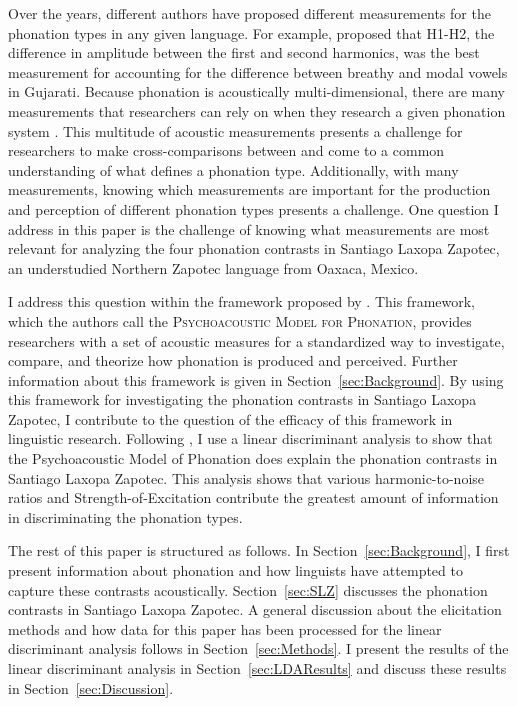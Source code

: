 \documentclass[12pt, letterpaper]{article}
\begin{document}
Over the years, different authors have proposed different measurements for the phonation types in any given language. For example, \citet{fischer-jorgensenPhoneticAnalysisBreathy1968} proposed that H1-H2, the difference in amplitude between the first and second harmonics, was the best measurement for accounting for the difference between breathy and modal vowels in Gujarati. Because phonation is acoustically multi-dimensional, there are many measurements that researchers can rely on when they research a given phonation system \citep{garellekAcousticDiscriminabilityComplex2020}. This multitude of acoustic measurements presents a challenge for researchers to make cross-comparisons between and come to a common understanding of what defines a phonation type. Additionally, with many measurements, knowing which measurements are important for the production and perception of different phonation types presents a challenge. One question I address in this paper is the challenge of knowing what measurements are most relevant for analyzing the four phonation contrasts in Santiago Laxopa Zapotec, an understudied Northern Zapotec language from Oaxaca, Mexico. 

I address this question within the framework proposed by \citet{kreimanUnifiedTheoryVoice2014}. This framework, which the authors call the \textsc{Psychoacoustic Model for Phonation}, provides researchers with a set of acoustic measures for a standardized way to investigate, compare, and theorize how phonation is produced and perceived. Further information about this framework is given in Section~\ref{sec:Background}. By using this framework for investigating the phonation contrasts in Santiago Laxopa Zapotec, I contribute to the question of the efficacy of this framework in linguistic research. Following \citet{garellekAcousticDiscriminabilityComplex2020}, I use a linear discriminant analysis \citep{fisherUseMultipleMeasurements1936} to show that the Psychoacoustic Model of Phonation does explain the phonation contrasts in Santiago Laxopa Zapotec. This analysis shows that various harmonic-to-noise ratios and Strength-of-Excitation contribute the greatest amount of information in discriminating the phonation types. 

The rest of this paper is structured as follows. In Section~\ref{sec:Background}, I first present information about phonation and how linguists have attempted to capture these contrasts acoustically. Section~\ref{sec:SLZ} discusses the phonation contrasts in Santiago Laxopa Zapotec. A general discussion about the elicitation methods and how data for this paper has been processed for the linear discriminant analysis follows in Section~\ref{sec:Methods}. I present the results of the linear discriminant analysis in Section~\ref{sec:LDAResults} and discuss these results in Section~\ref{sec:Discussion}.
\end{document}
